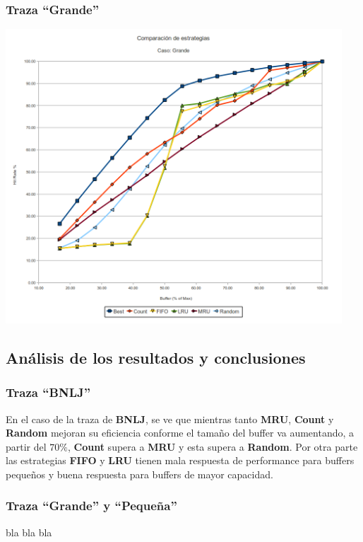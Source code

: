 \subsubsection*{Traza ``Grande''} 
\begin{center}
  \includegraphics[height=11cm]{big.png}
\end{center}  


\subsection{An\'alisis de los resultados y conclusiones}

\subsubsection*{Traza ``BNLJ''}
En el caso de la traza de \textbf{BNLJ}, se ve que mientras tanto \textbf{MRU}, \textbf{Count} y \textbf{Random} mejoran su eficiencia conforme el tama\~no del buffer
va aumentando, a partir del $70\%$, \textbf{Count} supera a \textbf{MRU} y esta supera a \textbf{Random}. Por otra parte las estrategias \textbf{FIFO} y \textbf{LRU} tienen
mala respuesta de performance para buffers peque\~nos y buena respuesta para buffers de mayor capacidad. 

\subsubsection*{Traza ``Grande'' y ``Peque\~na''}
bla bla bla

